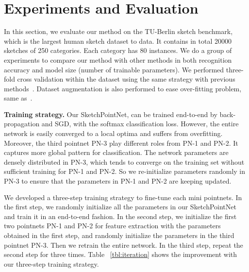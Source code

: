 \section{Experiments and Evaluation}
\label{sec:experiments}

In this section, we evaluate our method on the TU-Berlin sketch benchmark, which is the largest human sketch dataset to data. 
%
It contains in total 20000 sketches of 250 categories. Each category has 80 instances. 
%
We do a group of experiments to compare our method with other methods in both recognition accuracy and model size (number of trainable parameters). 
%
We performed three-fold cross validation within the dataset using 
the same strategy with previous methods~\cite{Yu2015SketchaNetTB, Dupont2016DeepSketch2D}.
Dataset augmentation is also performed to ease over-fitting problem, same as~\cite{Yu2015SketchaNetTB}.



\noindent \textbf{Training strategy.} 
%
Our SketchPointNet,  can be trained end-to-end by back-propagation and SGD, with the softmax classification loss.
%
However, the entire network is easily converged to a local optima and suffers from overfitting. 
Moreover, the third pointnet PN-3 play different roles from PN-1 and PN-2. It captures more global pattern for classification. 
%
The network parameters are densely distributed in PN-3, which tends to converge on the training set without sufficient training for PN-1 and PN-2. 
So we re-initialize parameters randomly in PN-3 to ensure that the parameters in PN-1 and PN-2 are keeping updated. 

We developed a three-step training strategy to fine-tune each mini pointnets.
%
In the first step, we randomly initialize all the parameters in our SketchPointNet and  train it in an end-to-end fashion.
%
In the second step, we initialize the first two pointnets PN-1 and PN-2 for feature extraction with the parameters obtained in the first step, and randomly initialize the parameters in the third pointnet PN-3. Then we retrain the entire network.
%
In the third step, repeat the second step for three times.
%
Table ~\ref{tbl:iteration} shows the improvement with our three-step training strategy.

